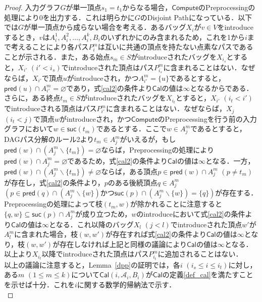 \begin{proof}
    入力グラフ$G$が単一頂点$s_1=t_1$からなる場合，$\mathsf{Compute}$のPreprocessingの処理により0を出力する．これは明らかに$G$のDisjoint Pathになっている．以下では$G$が単一頂点から成らない場合を考える．あるバッグ$X_i$が$v \in V$をintroduceするとき，$v$は$A^1_i, A^2_i,  \dots, A^k_i, B_i$のいずれかにのみ含まれるため，これを1から$i$まで考えることにより各パス$P^m_i$は互いに共通の頂点を持たない点素なパスであることが示される．また，ある始点$s_m \in S$がintroduceされたバッグを$X_{i_s}$とすると，$X_{i'}$ $(i' < i_s)$でintroduceされた頂点はパス$P^m_{i_s}$に含まれることはない．なぜならば，$X_{i'}$で頂点$u$がintroduceされ，かつ$A^m_{i'} = \{u\}$であるとすると，$\mathsf{pred}(u) \cap A^m_{i'} = \varnothing$であり，式\ref{cal2}の条件より$\mathsf{Cal}$の値は$\infty$となるからである．さらに，ある終点$t_m \in S$がintroduceされたバッグを$X_{i_t}$とすると，$X_{i'}$ $(i_t < i')$でintroduceされる頂点はパス$P^m_{i'}$に含まれることはない．なぜならば，$X_j$ $(i_t < j)$で頂点$w$がintroduceされ，かつ$\mathsf{Compute}$のPreprocessingを行う前の入力グラフにおいて$w \in \mathsf{suc}(t_m)$であるとする．ここで$w \in A^m_j$であるとすると，DAGパス分解のルール2より$t_m \in A^m_j$がいえるが，もし$\mathsf{pred}(w) \cap (A^m_j \backslash \{t_m\}) = \varnothing$ならば，Preprocessingの処理により$\mathsf{pred}(w) \cap A^m_j = \varnothing$であるため，式\ref{cal2}の条件より$\mathsf{Cal}$の値は$\infty$となる．一方，$\mathsf{pred}(w) \cap (A^m_j \backslash \{t_m\}) \neq \varnothing$ならば，ある頂点$p \in \mathsf{pred}(w) \cap A^m_j$ $(p \neq t_m)$が存在し，式\ref{cal2}の条件より，$p$のある後続頂点$q \in A^m_j$ $(p \in \mathsf{pred}(q) \cap (A^m_j \backslash \{w\}) \text{かつ} \mathsf{suc}(p) \cap (A^m_j \backslash \{w\}) = \{q\})$が存在する．Preprocessingの処理によって枝$(t_m, w)$が除かれることに注意すると$\{q, w\} \subseteq \mathsf{suc}(p) \cap A^m_j$が成り立つため，$w$のintroduceにおいて式\ref{cal2}の条件より$\mathsf{Cal}$の値は$\infty$となる．これ以降のバッグ$X_l$ $(j < l)$でintroduceされた頂点$w'$が$A^m_l$に含まれた場合，枝$(w, w')$が存在すれば式\ref{cal2}の条件より$\mathsf{Cal}$の値は$\infty$となり，枝$(w, w')$が存在しなければ上記と同様の議論により$\mathsf{Cal}$の値は$\infty$となる．以上より$X_{i_t}$以降でintroduceされた頂点はパス$P^m_{i_t}$に追加されることはない．\\
    以上の議論に注意すると，Lemma~\ref{dpp}の証明では，各$i$ $(i_s \leq i \leq i_t)$に対し，ある$m$ $(1 \leq m \leq k)$について$\mathsf{Cal}(i, \mathscr{A}_i, B_i)$が$\mathsf{Cal}$の定義\ref{def_cal}を満たすことを示せば十分．これを$i$に関する数学的帰納法で示す．\\

\end{proof}
